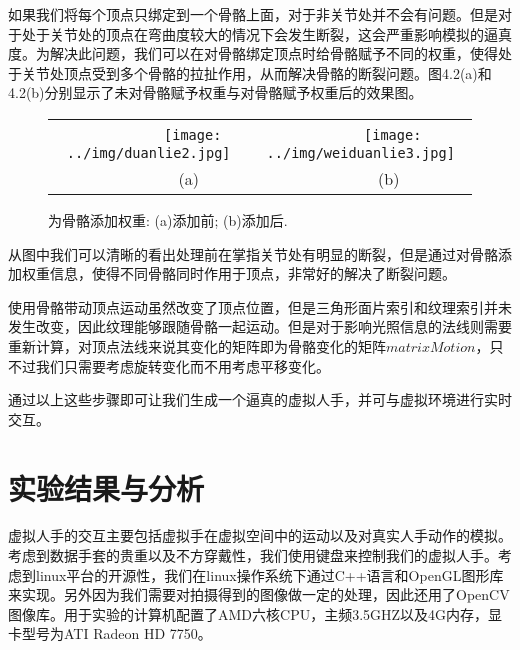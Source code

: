 如果我们将每个顶点只绑定到一个骨骼上面，对于非关节处并不会有问题。但是对于处于关节处的顶点在弯曲度较大的情况下会发生断裂，这会严重影响模拟的逼真度。为解决此问题，我们可以在对骨骼绑定顶点时给骨骼赋予不同的权重，使得处于关节处顶点受到多个骨骼的拉扯作用\cite{ZhangXL03}，从而解决骨骼的断裂问题。图4.2(a)和4.2(b)分别显示了未对骨骼赋予权重与对骨骼赋予权重后的效果图。
\begin{figure}[htb]
\begin{tabular}{cc}
~~~~~~~~~~~\texttt{[image: ../img/duanlie2.jpg]}&
~~~~~~~~\texttt{[image: ../img/weiduanlie3.jpg]}\\
~~~~~~~~~~(a)& ~~~~~~~(b)
\end{tabular}
\caption{为骨骼添加权重: (a)添加前; (b)添加后.}
\end{figure}
从图中我们可以清晰的看出处理前在掌指关节处有明显的断裂，但是通过对骨骼添加权重信息，使得不同骨骼同时作用于顶点，非常好的解决了断裂问题。

使用骨骼带动顶点运动虽然改变了顶点位置，但是三角形面片索引和纹理索引并未发生改变，因此纹理能够跟随骨骼一起运动。但是对于影响光照信息的法线则需要重新计算，对顶点法线来说其变化的矩阵即为骨骼变化的矩阵$matrixMotion$，只不过我们只需要考虑旋转变化而不用考虑平移变化。

通过以上这些步骤即可让我们生成一个逼真的虚拟人手，并可与虚拟环境进行实时交互。

\section{实验结果与分析}
虚拟人手的交互主要包括虚拟手在虚拟空间中的运动以及对真实人手动作的模拟\cite{Duhong11}。考虑到数据手套的贵重以及不方穿戴性，我们使用键盘来控制我们的虚拟人手。考虑到linux平台的开源性，我们在linux操作系统下通过C++语言和OpenGL图形库来实现。另外因为我们需要对拍摄得到的图像做一定的处理，因此还用了OpenCV图像库。用于实验的计算机配置了AMD六核CPU，主频3.5GHZ以及4G内存，显卡型号为ATI
Radeon HD 7750。

